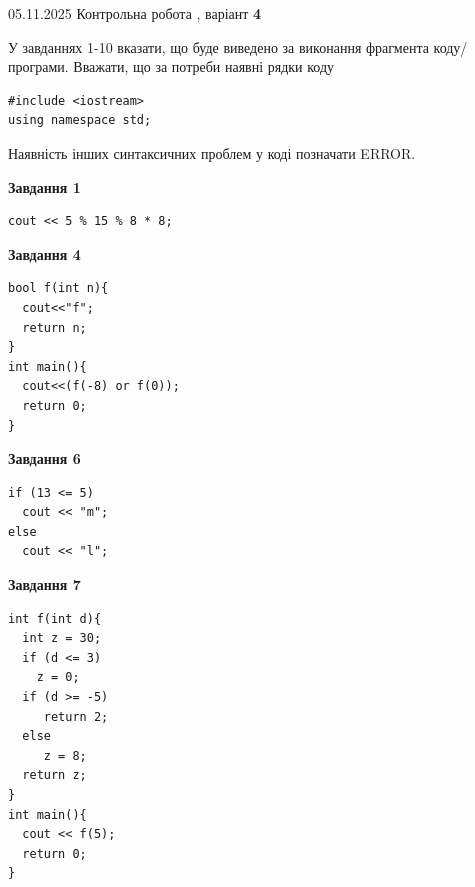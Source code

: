\documentclass[12pt, ukrainian]{article}
\begin{document}
{\Large{05.11.2025 Контрольна робота , варіант  \No \textbf { 4 }\par}}
{
\begin {large}
У завданнях 1-10 вказати, що буде виведено за виконання фрагмента коду/про\-гра\-ми.
Вважати, що за потреби наявні рядки коду
\begin{verbatim}
#include <iostream>
using namespace std;
\end{verbatim}
Наявність інших синтаксичних проблем у коді позначати ERROR.

\begin{minipage}[t]{7.0cm}

\begin{center}
\textbf{Завдання 1}
\end{center}
\vspace{-8mm}

\begin{verbatim}
cout << 5 % 15 % 8 * 8;
\end{verbatim}



\begin{center}
\textbf{Завдання 4}
\end{center}
\vspace{-8mm}

\begin{verbatim}
bool f(int n){
  cout<<"f";
  return n;
}
int main(){
  cout<<(f(-8) or f(0));
  return 0;
}
\end{verbatim}



\begin{center}
\textbf{Завдання 6}
\end{center}
\vspace{-8mm}

\begin{verbatim}
if (13 <= 5)
  cout << "m";
else
  cout << "l";
\end{verbatim}



\begin{center}
\textbf{Завдання 7}
\end{center}
\vspace{-8mm}

\begin{verbatim}
int f(int d){
  int z = 30;
  if (d <= 3)
    z = 0;
  if (d >= -5)
     return 2;
  else
     z = 8;
  return z;
}
int main(){
  cout << f(5);
  return 0;
}
\end{verbatim}


\end{minipage}
\end{large}}
\end{document}

